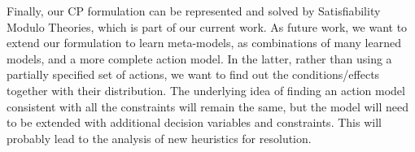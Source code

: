 \documentclass[runningheads]{llncs}
\begin{document}
Finally,
our CP formulation can be represented and solved by Satisfiability Modulo Theories, which is part of our current work. As future work, we want to extend our formulation to learn meta-models, as combinations of many learned models, and a more complete action model.
In the latter, rather than using a partially specified set of actions, we want to find out the conditions/effects together with their distribution.
The underlying idea of finding an action model consistent with all the constraints will remain the same, but the model will need to be extended with additional decision variables and constraints. %
This will probably lead to the analysis of new heuristics for resolution.








%
%
%


%
\end{document}
